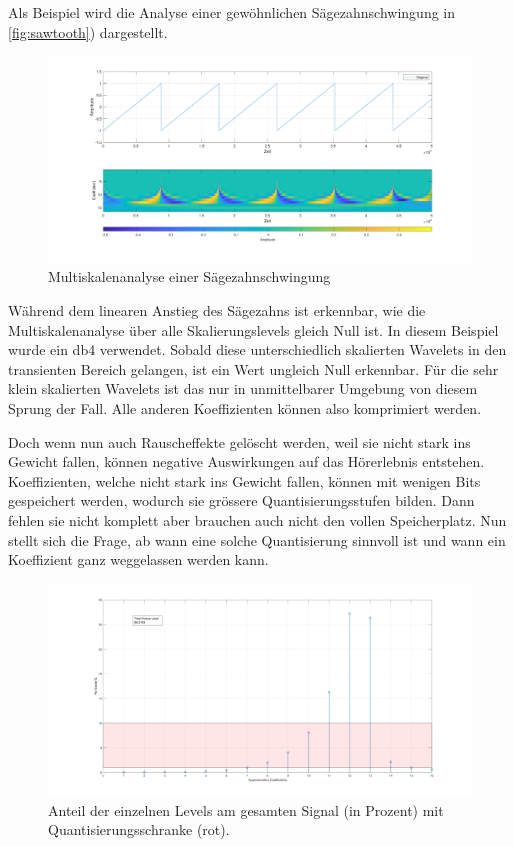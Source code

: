 \begin{refsection}
Als Beispiel wird die Analyse einer gewöhnlichen Sägezahnschwingung in \autoref{fig:sawtooth}) dargestellt.
\begin{figure}
	\centering
	\includegraphics[width=\linewidth]{papers/compress/Bilder/sawtooth}
	\caption{Multiskalenanalyse einer Sägezahnschwingung}
	\label{fig:sawtooth}
\end{figure}
Während dem linearen Anstieg des Sägezahns ist erkennbar, wie die Multiskalenanalyse über alle Skalierungslevels gleich Null ist.
In diesem Beispiel wurde ein db4 verwendet.
Sobald diese unterschiedlich skalierten Wavelets in den transienten Bereich gelangen, ist ein Wert ungleich Null erkennbar.
Für die sehr klein skalierten Wavelets ist das nur in unmittelbarer Umgebung von diesem Sprung der Fall.
Alle anderen Koeffizienten können also komprimiert werden.

Doch wenn nun auch Rauscheffekte gelöscht werden, weil sie nicht stark ins Gewicht fallen, können negative Auswirkungen auf das Hörerlebnis entstehen. 
Koeffizienten, welche nicht stark ins Gewicht fallen, können mit wenigen Bits gespeichert werden, wodurch sie grössere Quantisierungsstufen bilden. 
Dann fehlen sie nicht komplett aber brauchen auch nicht den vollen Speicherplatz.
Nun stellt sich die Frage, ab wann eine solche Quantisierung sinnvoll ist und wann ein Koeffizient ganz weggelassen werden kann. 

\begin{figure}
	\centering
	\includegraphics[width=\linewidth]{papers/compress/Bilder/recCoefs}
	\caption{Anteil der einzelnen Levels am gesamten Signal (in Prozent) mit Quantisierungsschranke (rot).}
	\label{fig:coefficients}
\end{figure} 


\end{refsection}
